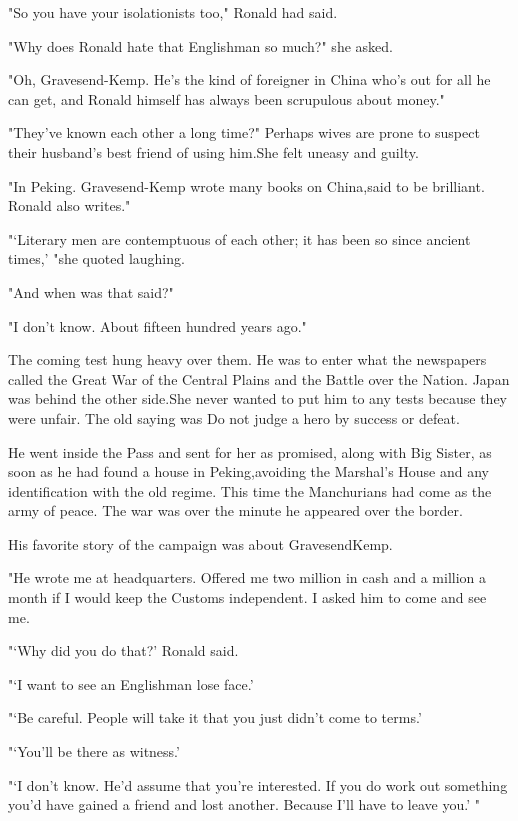 \par "So you have your isolationists too," Ronald had said.
\par "Why does Ronald hate that Englishman so much?" she asked.
\par "Oh, Gravesend-Kemp. He's the kind of foreigner in China who's out for all he can get, and Ronald himself has always been scrupulous about money."
\par "They've known each other a long time?" Perhaps wives are prone to suspect their husband's best friend of using him.She felt uneasy and guilty.
\par "In Peking. Gravesend-Kemp wrote many books on China,said to be brilliant. Ronald also writes."
\par "‘Literary men are contemptuous of each other; it has been so since ancient times,' "she quoted laughing.
\par "And when was that said?"
\par "I don't know. About fifteen hundred years ago."
\par The coming test hung heavy over them. He was to enter what the newspapers called the Great War of the Central Plains and the Battle over the Nation. Japan was behind the other side.She never wanted to put him to any tests because they were unfair. The old saying was Do not judge a hero by success or defeat.
\par He went inside the Pass and sent for her as promised, along with Big Sister, as soon as he had found a house in Peking,avoiding the Marshal's House and any identification with the old regime. This time the Manchurians had come as the army of peace. The war was over the minute he appeared over the border.
\par His favorite story of the campaign was about GravesendKemp.
\par "He wrote me at headquarters. Offered me two million in cash and a million a month if I would keep the Customs independent. I asked him to come and see me.
\par "‘Why did you do that?' Ronald said.
\par "‘I want to see an Englishman lose face.'
\par "‘Be careful. People will take it that you just didn't come to terms.'
\par "‘You'll be there as witness.'
\par "‘I don't know. He'd assume that you're interested. If you do work out something you'd have gained a friend and lost another. Because I'll have to leave you.' "
